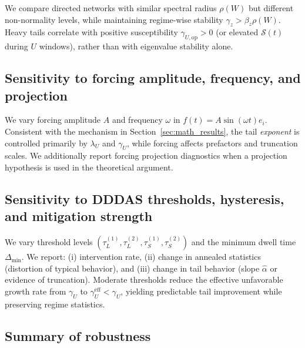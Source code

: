 \documentclass[12pt,a4paper]{article}
\theoremstyle{definition}
\theoremstyle{remark}
\begin{document}
We compare directed networks with similar spectral radius $\rho(W)$ but different non-normality levels, while maintaining regime-wise stability
$\gamma_z>\beta_z\rho(W)$.
Heavy tails correlate with positive susceptibility $\gamma_{U,\mathrm{op}}>0$ (or elevated $\mathcal{S}(t)$ during $U$ windows), rather than with eigenvalue stability alone.

\subsection{Sensitivity to forcing amplitude, frequency, and projection}
\label{app:sens_forcing}

We vary forcing amplitude $A$ and frequency $\omega$ in $f(t)=A\sin(\omega t)e_i$.
Consistent with the mechanism in Section~\ref{sec:math_results}, the tail \emph{exponent} is controlled primarily by $\lambda_U$ and $\gamma_U$, while forcing affects prefactors and truncation scales.
We additionally report forcing projection diagnostics when a projection hypothesis is used in the theoretical argument.

\subsection{Sensitivity to DDDAS thresholds, hysteresis, and mitigation strength}
\label{app:sens_dddas}

We vary threshold levels $(\tau_L^{(1)},\tau_L^{(2)},\tau_S^{(1)},\tau_S^{(2)})$ and the minimum dwell time $\Delta_{\min}$.
We report: (i) intervention rate, (ii) change in annealed statistics (distortion of typical behavior), and (iii) change in tail behavior (slope $\widehat{\alpha}$ or evidence of truncation).
Moderate thresholds reduce the effective unfavorable growth rate from $\gamma_U$ to $\gamma_U^{\mathrm{eff}}<\gamma_U$, yielding predictable tail improvement while preserving regime statistics.

\subsection{Summary of robustness}
\label{app:sens_summary}
\end{document}
